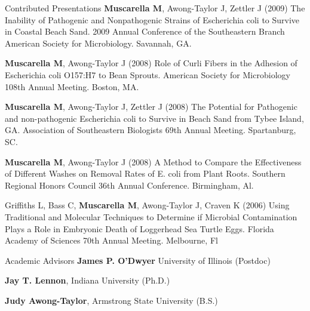\documentclass{resume} %
\begin{document}
\begin{rSection}{Contributed Presentations}
  {\bf Muscarella M}, Awong-Taylor J, Zettler J (2009) The Inability of
  Pathogenic and Nonpathogenic Strains of Escherichia coli to Survive in Coastal
  Beach Sand. 2009 Annual Conference of the Southeastern Branch American Society
  for Microbiology. Savannah, GA.

  {\bf Muscarella M}, Awong-Taylor J (2008) Role of Curli Fibers in the Adhesion
  of Escherichia coli O157:H7 to Bean Sprouts. American Society for Microbiology
  108th Annual Meeting. Boston, MA.

  {\bf Muscarella M}, Awong-Taylor J, Zettler J (2008) The Potential for
  Pathogenic and non-pathogenic Escherichia coli to Survive in Beach Sand from
  Tybee Island, GA. Association of Southeastern Biologists 69th Annual Meeting.
  Spartanburg, SC.

  {\bf Muscarella M}, Awong-Taylor J (2008) A Method to Compare the
  Effectiveness of Different Washes on Removal Rates of E. coli from Plant
  Roots. Southern Regional Honors Council 36th Annual Conference. Birmingham,
  Al.

  Griffiths L, Bass  C, {\bf Muscarella M}, Awong-Taylor J, Craven K (2006)
  Using Traditional and Molecular Techniques to Determine if Microbial
  Contamination Plays a Role in Embryonic Death of Loggerhead Sea Turtle Eggs.
  Florida Academy of Sciences 70th Annual Meeting. Melbourne, Fl

\end{rSection}


\begin{rSection}{Academic Advisors}
  {\bf James P. O'Dwyer} University of Illinois (Postdoc)

  {\bf Jay T. Lennon}, Indiana University (Ph.D.)

  {\bf Judy Awong-Taylor}, Armstrong State University (B.S.)

\end{rSection}
\end{document}
